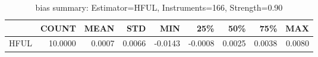 \begin{table}[ht]
\centering
\caption{bias summary: Estimator=HFUL, Instruments=166, Strength=0.90}
\begin{tabular}{lrrrrrrrr}
\toprule
 & COUNT & MEAN & STD & MIN & 25\% & 50\% & 75\% & MAX \\
\midrule
HFUL & 10.0000 & 0.0007 & 0.0066 & -0.0143 & -0.0008 & 0.0025 & 0.0038 & 0.0080 \\
\bottomrule
\end{tabular}
\end{table}
